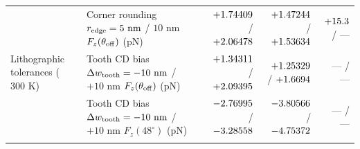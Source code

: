 \begin{table}[!htbp]
{\begin{tabular}{llrrr}
\midrule
\multirow{3}{*}{Lithographic tolerances ($300\text{ K}$)} 
 & Corner rounding $r_{\rm edge} = 5\text{ nm}$ / $10\text{ nm}$ $F_z(\theta_{\rm off})$ (pN) & $+1.74409{}$ / $+2.06478{}$ & $+1.47244{}$ / $+1.53634{}$ & $+\roundtwo{\NthreeUnithreedFoneoneoneRfivenmFzPn}$ / --- \\
 & Tooth CD bias $\Delta w_{\rm tooth} = -10\text{ nm}$ / $+10\text{ nm}$ $F_z(\theta_{\rm off})$ (pN) & $+1.34311{}$ / $+2.09395{}$ & $+1.25329{}$ / $+1.6694{}$ & --- / --- \\
 & Tooth CD bias $\Delta w_{\rm tooth} = -10\text{ nm}$ / $+10\text{ nm}$ $F_z(48^\circ)$ (pN) & $-2.76995{}$ / $-3.28558{}$ & $-3.80566{}$ / $-4.75372{}$ & --- / --- \\
\botrule
\end{tabular}%
}
\end{table}
